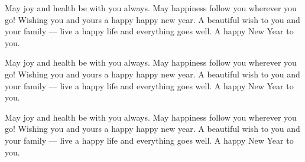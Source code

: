 {May joy and health be with you always. May happiness follow you wherever you go! Wishing you and yours a happy happy new year. A beautiful wish to you and your family --- live a happy life and everything goes well. A happy New Year to you. 

May joy and health be with you always. May happiness follow you wherever you go! Wishing you and yours a happy happy new year. A beautiful wish to you and your family --- live a happy life and everything goes well. A happy New Year to you. 

May joy and health be with you always. May happiness follow you wherever you go! Wishing you and yours a happy happy new year. A beautiful wish to you and your family --- live a happy life and everything goes well. A happy New Year to you. 

}



\makeenabstract